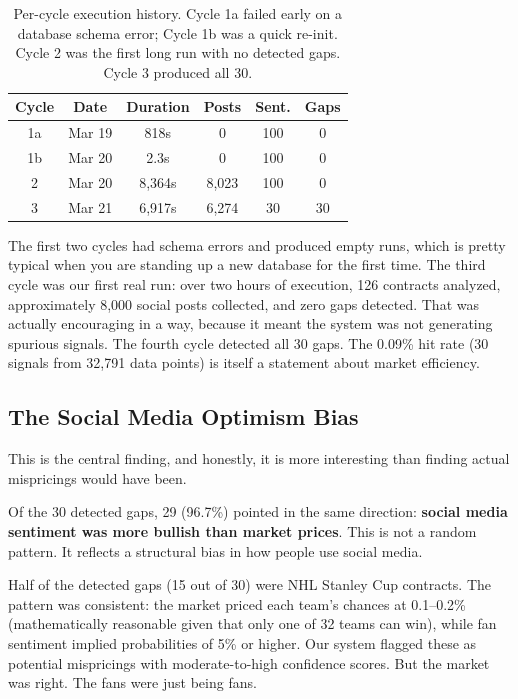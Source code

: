 \documentclass[conference]{IEEEtran}
\begin{document}
\begin{table}[H]
\centering
\caption{Per-cycle execution history. Cycle 1a failed early on a database schema error; Cycle 1b was a quick re-init. Cycle 2 was the first long run with no detected gaps. Cycle 3 produced all 30.}
\begin{tabular}{@{}cccccc@{}}
\toprule
\textbf{Cycle} & \textbf{Date} & \textbf{Duration} & \textbf{Posts} & \textbf{Sent.} & \textbf{Gaps} \\
\midrule
1a & Mar 19 & 818s & 0 & 100 & 0 \\
1b & Mar 20 & 2.3s & 0 & 100 & 0 \\
2 & Mar 20 & 8{,}364s & 8{,}023 & 100 & 0 \\
3 & Mar 21 & 6{,}917s & 6{,}274 & 30 & 30 \\
\bottomrule
\end{tabular}
\label{tab:cycles}
\end{table}

The first two cycles had schema errors and produced empty runs, which is pretty typical when you are standing up a new database for the first time. The third cycle was our first real run: over two hours of execution, 126 contracts analyzed, approximately 8,000 social posts collected, and zero gaps detected. That was actually encouraging in a way, because it meant the system was not generating spurious signals. The fourth cycle detected all 30 gaps. The 0.09\% hit rate (30 signals from 32,791 data points) is itself a statement about market efficiency.

\subsection{The Social Media Optimism Bias}

This is the central finding, and honestly, it is more interesting than finding actual mispricings would have been.

Of the 30 detected gaps, 29 (96.7\%) pointed in the same direction: \textbf{social media sentiment was more bullish than market prices}. This is not a random pattern. It reflects a structural bias in how people use social media.

Half of the detected gaps (15 out of 30) were NHL Stanley Cup contracts. The pattern was consistent: the market priced each team's chances at 0.1--0.2\% (mathematically reasonable given that only one of 32 teams can win), while fan sentiment implied probabilities of 5\% or higher. Our system flagged these as potential mispricings with moderate-to-high confidence scores. But the market was right. The fans were just being fans.
\end{document}
